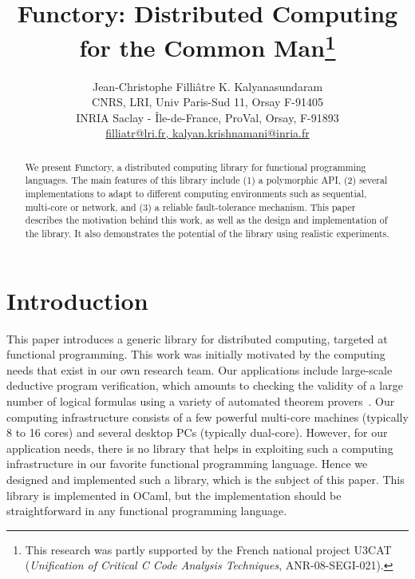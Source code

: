\documentclass[a4paper,12pt]{article}
\newcommand{\Ocaml}{OCaml}
\begin{document}
\title{Functory: Distributed Computing \\ for the Common Man\thanks{This
    research was partly supported by the French national project U3CAT
    (\emph{Unification of Critical C Code Analysis Techniques},
    ANR-08-SEGI-021).}} 

\author{Jean-Christophe Filli\^{a}tre \quad K. Kalyanasundaram \\
  CNRS, LRI, Univ Paris-Sud 11, Orsay F-91405\\
  INRIA Saclay - \^{I}le-de-France, ProVal, Orsay, F-91893 \\
   \url{filliatr@lri.fr, kalyan.krishnamani@inria.fr}}

\maketitle

\begin{abstract}
  We present Functory, a distributed computing library for
  functional programming languages. The main features of this library
  include (1) a polymorphic API, (2) several implementations to
  adapt to different computing environments such as sequential,
  multi-core or network, and (3) a reliable fault-tolerance mechanism.
  This paper describes the motivation behind this work, as well as
  the design and implementation of the library. It also demonstrates
  the potential of the library using realistic experiments.
\end{abstract}

\section{Introduction}

This paper introduces a generic library for distributed computing,
targeted at functional programming. 
This work was initially motivated by the computing needs that exist in our
own research team. Our applications include large-scale deductive
program verification, which amounts to checking the validity of a
large number of logical formulas using a variety of automated theorem
provers~\cite{filliatre07cav}. Our computing infrastructure consists
of a few powerful multi-core machines (typically 8 to 16 cores) and
several desktop PCs (typically dual-core). However, for our
application needs, there is no library that helps in exploiting such a
computing infrastructure in our favorite functional programming
language.  Hence we designed and implemented such a
library, which is the subject of this paper.
This library is implemented in \Ocaml, but the
implementation should be straightforward in any functional
programming language.
\end{document}
